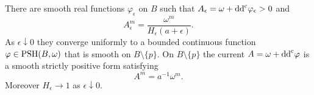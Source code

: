 \begin{lemma}\label{lem:radial-volume-representatives}
There are smooth real functions $\varphi_\epsilon$ on $B$ such that $A_\epsilon=\omega+\mathrm{dd}^{\mathrm{c}}\varphi_\epsilon>0$ and
\begin{equation}\label{eq:radial-volume-smooth-density}
 A_\epsilon^m=\frac{\omega^m}{H_\epsilon(a+\epsilon)}.
\end{equation}
As $\epsilon\downarrow0$ they converge uniformly to a bounded continuous function $\varphi\in\mathrm{PSH}(B,\omega)$ that is smooth on $B\setminus\{p\}$. On $B\setminus\{p\}$ the current $A=\omega+\mathrm{dd}^{\mathrm{c}}\varphi$ is a smooth strictly positive form satisfying
\begin{equation}\label{eq:radial-volume-endpoint-density}
 A^m=a^{-1}\omega^m.
\end{equation}
Moreover $H_\epsilon\to1$ as $\epsilon\downarrow0$.
\end{lemma}
